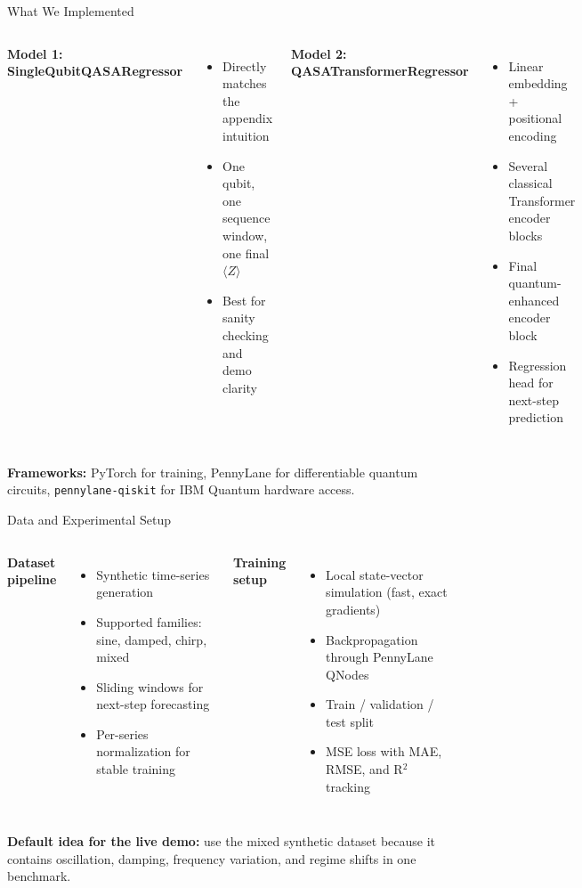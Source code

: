 \documentclass[aspectratio=169,professionalfonts]{beamer}
\begin{document}
\begin{frame}{What We Implemented}
\begin{columns}[T]
\textbf{Model 1: SingleQubitQASARegressor}
\begin{itemize}
  \item Directly matches the appendix intuition
  \item One qubit, one sequence window, one final $\langle Z \rangle$
  \item Best for sanity checking and demo clarity
\end{itemize}

\textbf{Model 2: QASATransformerRegressor}
\begin{itemize}
  \item Linear embedding + positional encoding
  \item Several classical Transformer encoder blocks
  \item Final quantum-enhanced encoder block
  \item Regression head for next-step prediction
\end{itemize}
\end{columns}

\vspace{0.7em}
\textbf{Frameworks:} PyTorch for training, PennyLane for differentiable quantum circuits, \texttt{pennylane-qiskit} for IBM Quantum hardware access.
\end{frame}

\begin{frame}{Data and Experimental Setup}
\begin{columns}[T]
\textbf{Dataset pipeline}
\begin{itemize}
  \item Synthetic time-series generation
  \item Supported families: sine, damped, chirp, mixed
  \item Sliding windows for next-step forecasting
  \item Per-series normalization for stable training
\end{itemize}

\textbf{Training setup}
\begin{itemize}
  \item Local state-vector simulation (fast, exact gradients)
  \item Backpropagation through PennyLane QNodes
  \item Train / validation / test split
  \item MSE loss with MAE, RMSE, and R$^2$ tracking
\end{itemize}
\end{columns}

\vspace{0.6em}
\textbf{Default idea for the live demo:} use the mixed synthetic dataset because it contains oscillation, damping, frequency variation, and regime shifts in one benchmark.
\end{frame}
\end{document}

